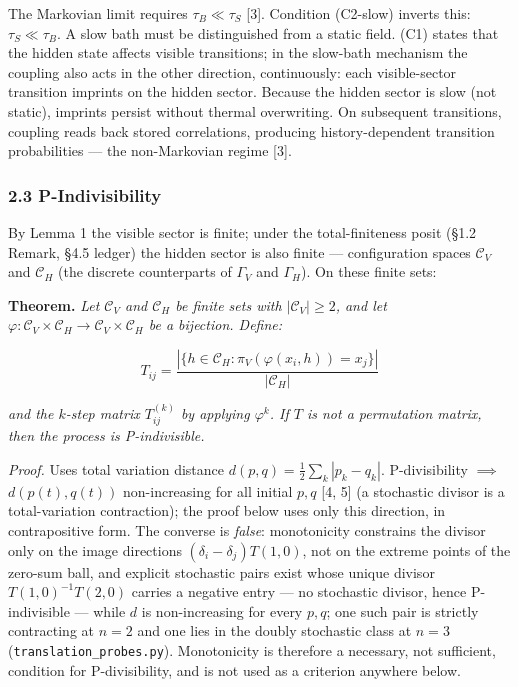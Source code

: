 \documentclass[
]{article}
\begin{document}
The Markovian limit requires \(\tau_B \ll \tau_S\) {[}3{]}. Condition
(C2-slow) inverts this: \(\tau_S \ll \tau_B\). A slow bath must be
distinguished from a static field. (C1) states that the hidden state
affects visible transitions; in the slow-bath mechanism the coupling
also acts in the other direction, continuously: each visible-sector
transition imprints on the hidden sector. Because the hidden sector is
slow (not static), imprints persist without thermal overwriting. On
subsequent transitions, coupling reads back stored correlations,
producing history-dependent transition probabilities --- the
non-Markovian regime {[}3{]}.

\hypertarget{p-indivisibility}{%
\subsubsection{2.3 P-Indivisibility}\label{p-indivisibility}}

By Lemma 1 the visible sector is finite; under the total-finiteness
posit (§1.2 Remark, §4.5 ledger) the hidden sector is also finite ---
configuration spaces \(\mathcal{C}_V\) and \(\mathcal{C}_H\) (the
discrete counterparts of \(\Gamma_V\) and \(\Gamma_H\)). On these finite
sets:

\textbf{Theorem.} \emph{Let \(\mathcal{C}_V\) and \(\mathcal{C}_H\) be
finite sets with \(|\mathcal{C}_V| \geq 2\), and let
\(\varphi: \mathcal{C}_V \times \mathcal{C}_H \to \mathcal{C}_V \times \mathcal{C}_H\)
be a bijection. Define:}

\[T_{ij} = \frac{|\{h \in \mathcal{C}_H : \pi_V(\varphi(x_i, h)) = x_j\}|}{|\mathcal{C}_H|}\]

\emph{and the \(k\)-step matrix \(T^{(k)}_{ij}\) by applying
\(\varphi^k\). If \(T\) is not a permutation matrix, then the process is
P-indivisible.}

\emph{Proof.} Uses total variation distance
\(d(p, q) = \frac{1}{2}\sum_k |p_k - q_k|\). P-divisibility \(\implies\)
\(d(p(t), q(t))\) non-increasing for all initial \(p, q\) {[}4, 5{]} (a
stochastic divisor is a total-variation contraction); the proof below
uses only this direction, in contrapositive form. The converse is
\emph{false}: monotonicity constrains the divisor only on the image
directions \((\delta_i - \delta_j)T(1,0)\), not on the extreme points of
the zero-sum ball, and explicit stochastic pairs exist whose unique
divisor \(T(1,0)^{-1}T(2,0)\) carries a negative entry --- no stochastic
divisor, hence P-indivisible --- while \(d\) is non-increasing for every
\(p, q\); one such pair is strictly contracting at \(n = 2\) and one
lies in the doubly stochastic class at \(n = 3\)
(\texttt{translation\_probes.py}). Monotonicity is therefore a
necessary, not sufficient, condition for P-divisibility, and is not used
as a criterion anywhere below.
\end{document}
